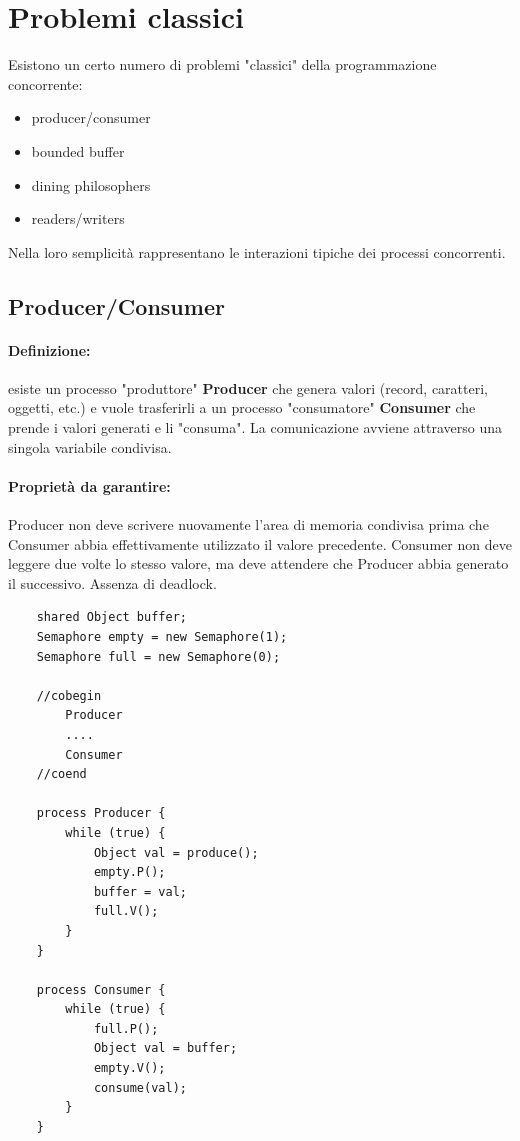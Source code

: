 \section{Problemi classici}
Esistono un certo numero di problemi "classici" della programmazione concorrente:
\begin{itemize}
    \item producer/consumer
    \item bounded buffer
    \item dining philosophers
    \item readers/writers
\end{itemize}

Nella loro semplicità rappresentano le interazioni tipiche dei processi concorrenti.

\subsection{Producer/Consumer}

\paragraph{Definizione:} esiste un processo "produttore" \textbf{Producer} che genera valori (record, caratteri, oggetti, etc.) e vuole trasferirli a un processo "consumatore" \textbf{Consumer} che prende i valori generati e li "consuma".
La comunicazione avviene attraverso una singola variabile condivisa.

\paragraph{Proprietà da garantire:} Producer non deve scrivere nuovamente l'area di memoria condivisa prima che Consumer abbia effettivamente utilizzato il valore precedente.
Consumer non deve leggere due volte lo stesso valore, ma deve attendere che Producer abbia generato il successivo.
Assenza di deadlock.

\begin{lstlisting}
    shared Object buffer;
    Semaphore empty = new Semaphore(1);
    Semaphore full = new Semaphore(0);

    //cobegin
        Producer
        ....
        Consumer
    //coend

    process Producer {
        while (true) {
            Object val = produce();
            empty.P();
            buffer = val;
            full.V();
        }
    }
    
    process Consumer {
        while (true) {
            full.P();
            Object val = buffer;
            empty.V();
            consume(val);
        }
    }

\end{lstlisting}


